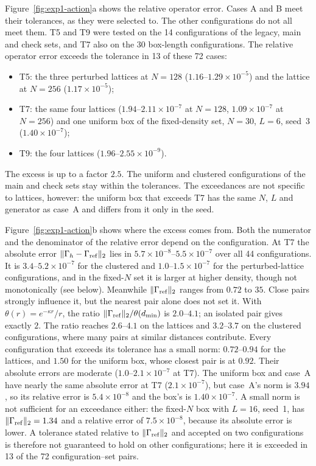 Figure~\ref{fig:exp1-action}a shows the relative operator error. Cases A and B meet their tolerances, as they were
selected to. The other configurations do not all meet them. T5 and T9 were tested on the 14 configurations of the
legacy, main and check sets, and T7 also on the 30 box-length configurations. The relative operator error exceeds the
tolerance in 13 of these 72 cases:
\begin{itemize}
\item T5: the three perturbed lattices at $N=128$ ($1.16$--$1.29\times10^{-5}$) and the lattice at $N=256$
  ($1.17\times10^{-5}$);
\item T7: the same four lattices ($1.94$--$2.11\times10^{-7}$ at $N=128$, $1.09\times10^{-7}$ at $N=256$) and one
  uniform box of the fixed-density set, $N=30$, $L=6$, seed~3 ($1.40\times10^{-7}$);
\item T9: the four lattices ($1.96$--$2.55\times10^{-9}$).
\end{itemize}
The excess is up to a factor $2.5$. The uniform and clustered configurations of the main and check sets stay within the
tolerances. The exceedances are not specific to lattices, however: the uniform box that exceeds T7 has the same $N$,
$L$ and generator as case~A and differs from it only in the seed.

Figure~\ref{fig:exp1-action}b shows where the excess comes from. Both the numerator and the denominator of the relative
error depend on the configuration. At T7 the absolute error $\|\Gamma_h-\Gamma_{\rm ref}\|_2$ lies in
$5.7\times10^{-8}$--$5.5\times10^{-7}$ over all 44 configurations. It is $3.4$--$5.2\times10^{-7}$ for the clustered and
$1.0$--$1.5\times10^{-7}$ for the perturbed-lattice configurations, and in the fixed-$N$ set it is larger at higher density, though not monotonically (see
below).
Meanwhile $\|\Gamma_{\rm ref}\|_2$ ranges from $0.72$ to $35$. Close pairs strongly influence it, but the nearest pair
alone does not set it. With $\theta(r)=e^{-\kappa r}/r$, the ratio $\|\Gamma_{\rm ref}\|_2/\theta(d_{\min})$ is
$2.0$--$4.1$; an isolated pair gives exactly $2$. The ratio reaches $2.6$--$4.1$ on the lattices and $3.2$--$3.7$ on the
clustered configurations, where many pairs at similar distances contribute. Every configuration that exceeds its
tolerance has a small norm: $0.72$--$0.94$ for the lattices, and $1.50$ for the uniform box, whose closest pair is at
$0.92$. Their absolute errors are moderate ($1.0$--$2.1\times10^{-7}$ at T7). The uniform box and case~A have nearly the same absolute error at T7
($2.1\times10^{-7}$), but case~A's norm is $3.94$, so its relative error is $5.4\times10^{-8}$ and the box's is
$1.40\times10^{-7}$. A small norm is not sufficient for an exceedance either: the fixed-$N$ box with $L=16$, seed~1, has
$\|\Gamma_{\rm ref}\|_2=1.34$ and a relative error of $7.5\times10^{-8}$, because its absolute error is lower. A
tolerance stated relative to $\|\Gamma_{\rm ref}\|_2$ and accepted on two configurations is therefore not guaranteed to
hold on other configurations; here it is exceeded in 13 of the 72 configuration--set pairs.

